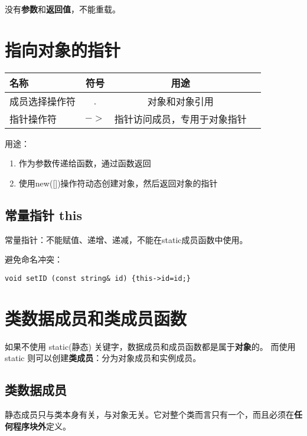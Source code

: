 没有\textbf{参数}和\textbf{返回值}，不能重载。

\section{指向对象的指针}

\begin{table}[!htbp]
    \centering
    \begin{tabular}{lccc}
        \toprule
        名称           & 符号 & 用途                         \\
        \midrule
        成员选择操作符 & .    & 对象和对象引用               \\
        指针操作符     & $->$ & 指针访问成员，专用于对象指针 \\
        \bottomrule
    \end{tabular}
\end{table}

用途：
\begin{enumerate}
    \item 作为参数传递给函数，通过函数返回
    \item 使用new([])操作符动态创建对象，然后返回对象的指针
\end{enumerate}

\subsection{常量指针 this}

常量指针：不能赋值、递增、递减，不能在static成员函数中使用。

避免命名冲突：
\begin{lstlisting}[frame=shadowbox]
    void setID (const string& id) {this->id=id;}
\end{lstlisting}

\section{类数据成员和类成员函数}

如果不使用 static(静态) 关键字，数据成员和成员函数都是属于\textbf{对象}的。
而使用 static 则可以创建\textbf{类成员}：分为对象成员和实例成员。

\subsection{类数据成员}

静态成员只与类本身有关，与对象无关。它对整个类而言只有一个，而且必须在\textbf{任何程序块外}定义。

